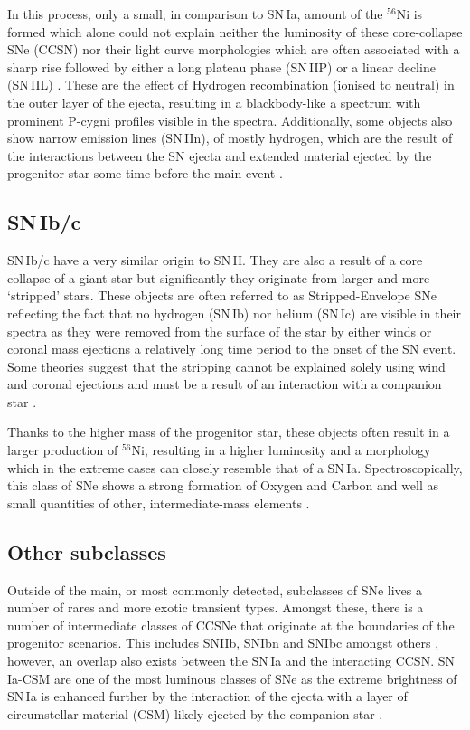 In this process, only a small, in comparison to SN\,Ia, amount of the $^{56}$Ni is formed which alone could not explain neither the luminosity of these core-collapse SNe (CCSN) nor their light curve morphologies which are often associated with a sharp rise followed by either a long plateau phase (SN\,IIP) or a linear decline (SN\,IIL) \citep{Alsabti2017}. These are the effect of Hydrogen recombination (ionised to neutral) in the outer layer of the ejecta, resulting in a blackbody-like a spectrum with prominent P-cygni profiles visible in the spectra. Additionally, some objects also show narrow emission lines (SN\,IIn), of mostly hydrogen, which are the result of the interactions between the SN ejecta and extended material ejected by the progenitor star some time before the main event \citep{Pastorello2002,Sternberg2011}.

\subsection{SN\,Ib/c}
SN\,Ib/c have a very similar origin to SN\,II. They are also a result of a core collapse of a giant star but significantly they originate from larger and more `stripped' stars. These objects are often referred to as Stripped-Envelope SNe reflecting the fact that no hydrogen (SN\,Ib) nor helium (SN\,Ic) are visible in their spectra as they were removed from the surface of the star by either winds or coronal mass ejections a relatively long time period to the onset of the SN event. Some theories suggest that the stripping cannot be explained solely using wind and coronal ejections and must be a result of an interaction with a companion star \citep{Tauris2013}.

Thanks to the higher mass of the progenitor star, these objects often result in a larger production of $^{56}$Ni, resulting in a higher luminosity and a morphology which in the extreme cases can closely resemble that of a SN\,Ia. Spectroscopically, this class of SNe shows a strong formation of Oxygen and Carbon and well as small quantities of other, intermediate-mass elements \citep{Filippenko1997}.

\subsection{Other subclasses}
Outside of the main, or most commonly detected, subclasses of SNe lives a number of rares and more exotic transient types. Amongst these, there is a number of intermediate classes of CCSNe that originate at the boundaries of the progenitor scenarios. This includes SNIIb, SNIbn and SNIbc amongst others \citep{Alsabti2017}, however, an overlap also exists between the SN\,Ia and the interacting CCSN. SN\,Ia-CSM are one of the most luminous classes of SNe as the extreme brightness of SN\,Ia is enhanced further by the interaction of the ejecta with a layer of circumstellar material (CSM) likely ejected by the companion star \citep{Dilday2012}.

